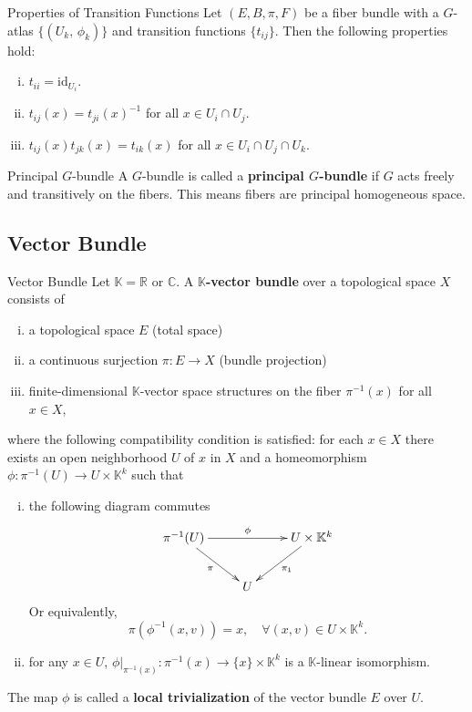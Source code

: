 \documentclass{report}
\begin{document}
\begin{proposition}{Properties of Transition Functions}
	Let $(E, B, \pi, F)$ be a fiber bundle with a $G$-atlas $\{(U_k,\, \phi_k)\}$ and transition functions $\{t_{ij}\}$. Then the following properties hold:
	\begin{enumerate}[(i)]
		\item $t_{ii}=\mathrm{id}_{U_i}$.
		\item $t_{ij}(x)=t_{ji}(x)^{-1}$ for all $x\in U_i\cap U_j$.
		\item $t_{ij}(x)t_{jk}(x)=t_{ik}(x)$ for all $x\in U_i\cap U_j\cap U_k$.
	\end{enumerate} 
	
\end{proposition}

\begin{proposition}{Principal $G$-bundle}{}
	A $G$-bundle is called a \textbf{principal $G$-bundle} if $G$ acts freely and transitively on the fibers. This means fibers are principal homogeneous space.
\end{proposition}

\subsection{Vector Bundle}

\begin{definition}{Vector Bundle}{}
	Let $\mathbb{K}=\mathbb{R}\text{ or }\mathbb{C}$. A \textbf{$\mathbb{K}$-vector bundle} over a topological space $X$ consists of
	\begin{enumerate}[(i)]
		\item a topological space $E$ (total space)
		\item a continuous surjection $\pi:E\to X$ (bundle projection)
		\item finite-dimensional $\mathbb{K}$-vector space structures on the fiber $\pi^{-1}(x)$ for all $x\in X$,
	\end{enumerate}
	where the following compatibility condition is satisfied: for each $x\in X$ there exists an open neighborhood $U$ of $x$ in $X$ and a homeomorphism $\phi:\pi^{-1}(U)\to U\times \mathbb{K}^k$ such that
	\begin{enumerate}[(i)]
		\item the following diagram commutes
		      \[\xymatrix{
				      \pi^{-1}(U)\ar[rd]_{\pi}\ar[rr]^{\phi}  & &U\times \mathbb{K}^k\ar[ld]^{\pi_1}\\
				      &U&
			      }\]
				  Or equivalently, 
				  \[
				 \pi(\phi^{-1}(x,v))=x,\quad\forall (x,v)\in U\times \mathbb{K}^k.
				  \]
		\item for any $x\in U$, $\left.\phi\right|_{\pi^{-1}(x)}:\pi^{-1}(x)\to \{x\}\times \mathbb{K}^k$ is a $\mathbb{K}$-linear isomorphism.
	\end{enumerate}
	The map $\phi$ is called a \textbf{local trivialization} of the vector bundle $E$ over $U$.
\end{definition}
\end{document}
